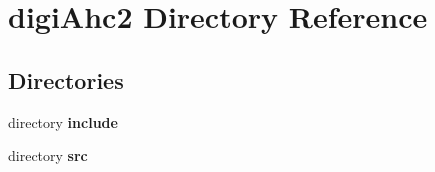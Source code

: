 \section{digi\-Ahc2 Directory Reference}
\label{dir_d85233833618583ef4d7b9ad1d7aa55d}
\subsection*{Directories}
\begin{DoxyCompactItemize}
\item 
directory {\bf include}
\item 
directory {\bf src}
\end{DoxyCompactItemize}
